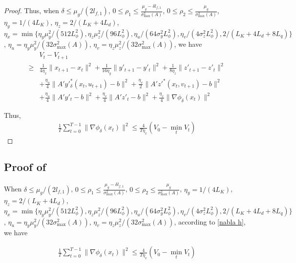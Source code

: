\documentclass{article}
\theoremstyle{plain}
\theoremstyle{definition}
\theoremstyle{remark}
\begin{document}
\begin{proof}
Thus, when  $\delta\leq \mu_g/(2l_{f,1})$, $0\leq \rho_1\leq \frac{\mu_g-\delta l_{f,1}}{\sigma_{\max}^2(A)}$, $0\leq \rho_2\leq \frac{\mu_g}{\sigma_{\max}^2(A)}$, $\eta_y=1/(4L_K)$, $\eta_z=2/(L_K+4L_d)$, $\eta_x=\min\{\eta_y\mu_y^2/(512L_\phi^2), \eta_z\mu_z^2/(96L_\phi^2), \eta_u/(64\sigma_y^2L_\phi^2), \eta_v/(4\sigma_z^2L_\phi^2), 2/(L_K+4L_d+8L_q)\}$, $\eta_u=\eta_y\mu_y^2/(32\sigma_{\max}^2(A))$, $\eta_v=\eta_z\mu_z^2/(32\sigma_{\max}^2(A))$, we have
\begin{align}\nonumber
    &V_t-V_{t+1}\\ \nonumber
    \geq&\frac{1}{4\eta_x}\|x_{t+1}-x_t\|^2+\frac{1}{16\eta_y}\|y'_{t+1}-y'_t\|^2+\frac{1}{8\eta_z}\|z'_{t+1}-z'_t\|^2\\ \nonumber
    &+\frac{\eta_u}{4}\|A'y'^*_\delta(x_t,u_{t+1})-b\|^2+\frac{\eta_v}{2}\|A'z'^*(x_t,v_{t+1})-b\|^2\\ 
    &+\frac{\eta_u}{4}\|A'y'_t-b\|^2+\frac{\eta_v}{4}\|A'z'_t-b\|^2+\frac{\eta_x}{4}\|\nabla \phi_\delta(x_t)\|^2 \label{eq: v}
\end{align}


Thus,
     \begin{align}\label{nabla h}
        \frac{1}{T}\sum_{t=0}^{T-1}\|\nabla \phi_\delta(x_{t})\|^2\leq \frac{4}{T\eta_x}(V_0-\min_tV_t )
    \end{align}  



\end{proof}




\subsection*{Proof of }

When $\delta\leq \mu_g/(2l_{f,1})$, $0\leq \rho_1\leq \frac{\mu_g-\delta l_{f,1}}{\sigma_{\max}^2(A)}$, $0\leq \rho_2\leq \frac{\mu_g}{\sigma_{\max}^2(A)}$, $\eta_y=1/(4L_K)$, $\eta_z=2/(L_K+4L_d)$, $\eta_x=\min\{\eta_y\mu_y^2/(512L_\phi^2), \eta_z\mu_z^2/(96L_\phi^2), \eta_u/(64\sigma_y^2L_\phi^2), \eta_v/(4\sigma_z^2L_\phi^2), 2/(L_K+4L_d+8L_q)\}$, $\eta_u=\eta_y\mu_y^2/(32\sigma_{\max}^2(A))$, $\eta_v=\eta_z\mu_z^2/(32\sigma_{\max}^2(A))$, according to \eqref{nabla h}, we have

 \begin{align}
    \frac{1}{T}\sum_{t=0}^{T-1}\|\nabla \phi_\delta(x_{t})\|^2\leq \frac{4}{T\eta_x}(V_0-\min_tV_t )
\end{align}  
\end{document}
